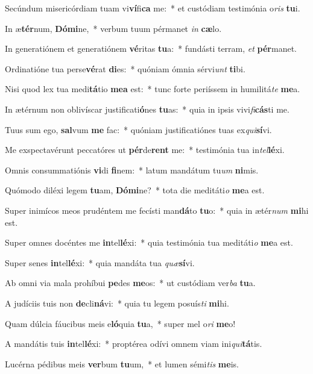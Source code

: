 \item Secúndum misericórdiam tuam vi\textbf{ví}fi\textbf{ca} me:~* et custódiam testimónia o\textit{ris} \textbf{tu}i.
\item In æ\textbf{tér}num, \textbf{Dó}\textbf{mi}ne,~* verbum tuum pérmanet \textit{in} \textbf{cæ}lo.
\item In generatiónem et generatiónem \textbf{vé}ritas \textbf{tu}a:~* fundásti terram, \textit{et} \textbf{pér}manet.
\item Ordinatióne tua perse\textbf{vé}rat \textbf{di}es:~* quóniam ómnia sérvi\textit{unt} \textbf{ti}bi.
\item Nisi quod lex tua medi\textbf{tá}tio \textbf{me}\textbf{a} est:~* tunc forte periíssem in humilitá\textit{te} \textbf{me}a.
\item In ætérnum non oblivíscar justificati\textbf{ó}nes \textbf{tu}as:~* quia in ipsis vivi\textit{fi}\textbf{cás}ti me.
\item Tuus sum ego, \textbf{sal}vum \textbf{me} fac:~* quóniam justificatiónes tuas ex\textit{qui}\textbf{sí}vi.
\item Me exspectavérunt peccatóres ut \textbf{pér}de\textbf{rent} me:~* testimónia tua in\textit{tel}\textbf{lé}xi.
\item Omnis consummatiónis \textbf{vi}di \textbf{fi}nem:~* latum mandátum tu\textit{um} \textbf{ni}mis.
\item Quómodo diléxi legem \textbf{tu}am, \textbf{Dó}\textbf{mi}ne?~* tota die meditáti\textit{o} \textbf{me}a est.
\item Super inimícos meos prudéntem me fecísti man\textbf{dá}to \textbf{tu}o:~* quia in ætér\textit{num} \textbf{mi}hi est.
\item Super omnes docéntes me \textbf{in}tel\textbf{lé}xi:~* quia testimónia tua meditáti\textit{o} \textbf{me}a est.
\item Super senes \textbf{in}tel\textbf{lé}xi:~* quia mandáta tua \textit{quæ}\textbf{sí}vi.
\item Ab omni via mala prohíbui \textbf{pe}des \textbf{me}os:~* ut custódiam ver\textit{ba} \textbf{tu}a.
\item A judíciis tuis non \textbf{de}cli\textbf{ná}vi:~* quia tu legem posuís\textit{ti} \textbf{mi}hi.
\item Quam dúlcia fáucibus meis e\textbf{ló}quia \textbf{tu}a,~* super mel o\textit{ri} \textbf{me}o!
\item A mandátis tuis \textbf{in}tel\textbf{lé}xi:~* proptérea odívi omnem viam ini\textit{qui}\textbf{tá}tis.
\item Lucérna pédibus meis \textbf{ver}bum \textbf{tu}um,~* et lumen sémi\textit{tis} \textbf{me}is.
